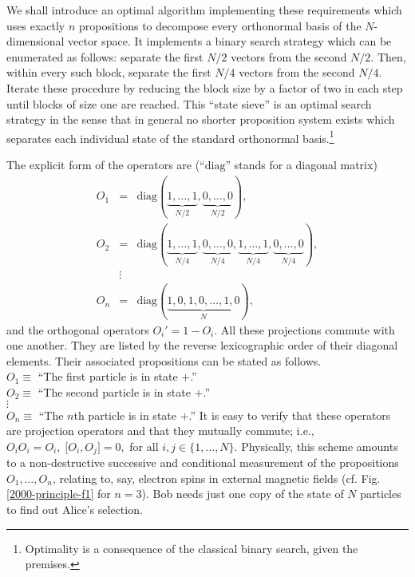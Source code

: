 We shall introduce an optimal
algorithm implementing these requirements
which uses exactly $n$ propositions to decompose every orthonormal basis of
the $N$-dimensional vector space.
It implements a binary search strategy which can be enumerated as follows:
separate the first ${N / 2}$ vectors from the second ${N / 2}$.
Then, within every such block, separate the first ${N / 4}$ vectors from the second ${N / 4}$.
Iterate these procedure by reducing the block size by a factor of two in each step until
blocks of size one are reached.
This ``state sieve'' is an optimal search strategy in the sense that
in general no shorter proposition system
exists which  separates each individual state of the
standard orthonormal basis.\footnote{
Optimality is a consequence of the classical binary search,
given the premises.}

The explicit form of the operators are
(``$\textrm{diag}$'' stands for a diagonal matrix)
\begin{eqnarray}
O_1&=&\textrm{diag}\left(\underbrace{1,\ldots ,1}_{N/2},\underbrace{0,\ldots,0}_{N/2}\right),\\
O_2&=&\textrm{diag}\left(\underbrace{1,\ldots ,1}_{N/4},\underbrace{0,\ldots,0}_{N/4},\underbrace{1,\ldots ,1}_{N/4},\underbrace{0,\ldots,0}_{N/4}\right),\\
&\vdots &\nonumber \\
O_n&=&\textrm{diag}\left(\underbrace{1,0,1,0,\ldots ,1,0}_{N}\right),
\end{eqnarray}
and the orthogonal operators $O_i' =1-O_i$. All these projections commute with one another.
They are listed by the reverse lexicographic order of their diagonal elements.
Their associated propositions can be stated as follows.\\
$O_1\equiv $ ``The first particle is in state $+$.''     \\
$O_2\equiv $ ``The second particle is in state $+$.''      \\
$\vdots$                                                     \\
$O_n\equiv $ ``The $n$th particle is in state $+$.''
It is easy to verify that these operators are projection operators and that they mutually commute; i.e.,
$O_iO_i=O_i,\;  \big[O_i,O_j\big]=0,$ for all $i,j\in \{1,\ldots ,N\}$.
Physically, this scheme amounts to a non-destructive successive and conditional measurement of
the propositions $O_1,\ldots ,O_n$, relating to, say, electron spins in external magnetic fields
(cf. Fig. \ref{2000-principle-f1} for $n=3$).
Bob needs just one copy of the state of $N$ particles to find out Alice's selection.
